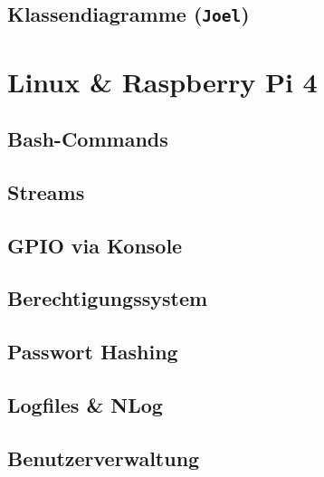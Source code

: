 \documentclass[
  9pt,
  a4paperpaper,
  DIV=11]{scrartcl}
\numberwithin{equation}{section}
\begin{document}
\begin{multicols}{2}
\hypertarget{klassendiagramme-joel}{%
\subsection{\texorpdfstring{Klassendiagramme
(\texttt{Joel})}{Klassendiagramme (Joel)}}\label{klassendiagramme-joel}}

\hypertarget{linux-raspberry-pi-4}{%
\section{Linux \& Raspberry Pi 4}\label{linux-raspberry-pi-4}}

\hypertarget{bash-commands}{%
\subsection{Bash-Commands}\label{bash-commands}}

\hypertarget{streams-1}{%
\subsection{Streams}\label{streams-1}}

\hypertarget{gpio-via-konsole}{%
\subsection{GPIO via Konsole}\label{gpio-via-konsole}}

\hypertarget{berechtigungssystem}{%
\subsection{Berechtigungssystem}\label{berechtigungssystem}}

\hypertarget{passwort-hashing}{%
\subsection{Passwort Hashing}\label{passwort-hashing}}

\hypertarget{logfiles-nlog}{%
\subsection{Logfiles \& NLog}\label{logfiles-nlog}}

\hypertarget{benutzerverwaltung}{%
\subsection{Benutzerverwaltung}\label{benutzerverwaltung}}


\end{multicols}
\end{document}
